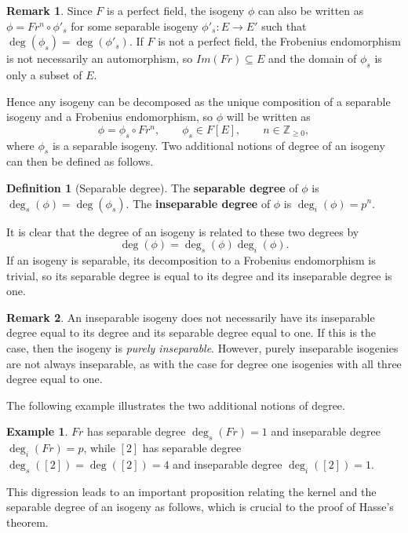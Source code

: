 \documentclass{article}
\newcommand{\Z}{\mathbb{Z}}
\newcommand{\rb}[1]{\left( #1 \right)}
\renewcommand{\sb}[1]{\left[ #1 \right]}
\theoremstyle{definition}\newtheorem*{definition}{Definition}
\theoremstyle{definition}\newtheorem*{example}{Example}
\theoremstyle{definition}\newtheorem*{remark}{Remark}
\begin{document}
\begin{remark}
Since $ F $ is a perfect field, the isogeny $ \phi $ can also be written as $ \phi = Fr^n \circ \phi'_s $ for some separable isogeny $ \phi'_s : E \to E' $ such that $ \deg\rb{\phi_s} = \deg\rb{\phi'_s} $. If $ F $ is not a perfect field, the Frobenius endomorphism is not necessarily an automorphism, so $ Im\rb{Fr} \subseteq E $ and the domain of $ \phi_s $ is only a subset of $ E $.
\end{remark}

Hence any isogeny can be decomposed as the unique composition of a separable isogeny and a Frobenius endomorphism, so $ \phi $ will be written as
$$ \phi = \phi_s \circ Fr^n, \qquad \phi_s \in F\sb{E}, \qquad n \in \Z_{\ge 0}, $$
where $ \phi_s $ is a separable isogeny. Two additional notions of degree of an isogeny can then be defined as follows.

\begin{definition}[Separable degree]
The \textbf{separable degree} of $ \phi $ is $ \deg_s\rb{\phi} = \deg\rb{\phi_s} $. The \textbf{inseparable degree} of $ \phi $ is $ \deg_i\rb{\phi} = p^n $.
\end{definition}

It is clear that the degree of an isogeny is related to these two degrees by
$$ \deg\rb{\phi} = \deg_s\rb{\phi}\deg_i\rb{\phi}. $$
If an isogeny is separable, its decomposition to a Frobenius endomorphism is trivial, so its separable degree is equal to its degree and its inseparable degree is one.

\begin{remark}
An inseparable isogeny does not necessarily have its inseparable degree equal to its degree and its separable degree equal to one. If this is the case, then the isogeny is \emph{purely inseparable}. However, purely inseparable isogenies are not always inseparable, as with the case for degree one isogenies with all three degree equal to one.
\end{remark}

The following example illustrates the two additional notions of degree.

\begin{example}
$ Fr $ has separable degree $ \deg_s\rb{Fr} = 1 $ and inseparable degree $ \deg_i\rb{Fr} = p $, while $ \sb{2} $ has separable degree $ \deg_s\rb{\sb{2}} = \deg\rb{\sb{2}} = 4 $ and inseparable degree $ \deg_i\rb{\sb{2}} = 1 $.
\end{example}

This digression leads to an important proposition relating the kernel and the separable degree of an isogeny as follows, which is crucial to the proof of Hasse's theorem.
\end{document}
